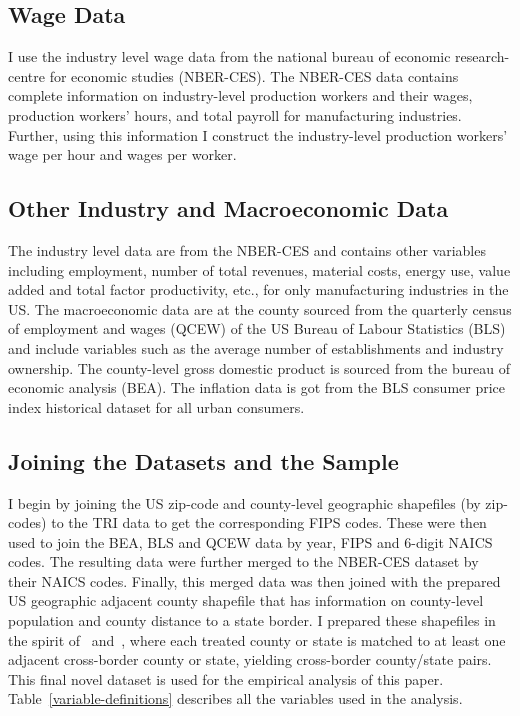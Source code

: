 \documentclass{C:/Users/david/OneDrive/Documents/ULMS/PhD/Thesis/chapter3/src/climate_change/latex/Economic_Journal/OUP-EJ}
\begin{document}
    \subsection{Wage Data}\label{subsec:wage-data}
    I use the industry level wage data from the national bureau of economic research-centre for economic studies (NBER-CES). The NBER-CES data contains complete information on industry-level production workers and their wages, production workers' hours, and total payroll for manufacturing industries. Further, using this information I construct the industry-level production workers' wage per hour and wages per worker.

    \subsection{Other Industry and Macroeconomic Data}\label{subsec:other-industry-and-macroeconomic-data}
    The industry level data are from the NBER-CES and contains other variables including employment, number of total revenues, material costs, energy use, value added and total factor productivity, etc., for only manufacturing industries in the US. The macroeconomic data are at the county sourced from the quarterly census of employment and wages (QCEW) of the US Bureau of Labour Statistics (BLS) and include variables such as the average number of establishments and industry ownership. The county-level gross domestic product is sourced from the bureau of economic analysis (BEA). The inflation data is got from the BLS consumer price index historical dataset for all urban consumers.

    \subsection{Joining the Datasets and the Sample}\label{subsec:joining-the-datasets-and-the-sample}
    I begin by joining the US zip-code and county-level geographic shapefiles (by zip-codes) to the TRI data to get the corresponding FIPS codes. These were then used to join the BEA, BLS and QCEW data by year, FIPS and $6$-digit NAICS codes. The resulting data were further merged to the NBER-CES dataset by their NAICS codes. Finally, this merged data was then joined with the prepared US geographic adjacent county shapefile that has information on county-level population and county distance to a state border. I prepared these shapefiles in the spirit of~\citet{dube2010minimum} and~\citet{gopalan2021state}, where each treated county or state is matched to at least one adjacent cross-border county or state, yielding cross-border county/state pairs. This final novel dataset is used for the empirical analysis of this paper.
    Table~\ref{variable-definitions} describes all the variables used in the analysis.
\end{document}

